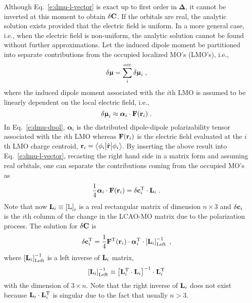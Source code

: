 \documentclass[aip,jcp,preprint,amsmath,amssymb,floatfix]{revtex4-1}
\newcommand{\tbraket}[3]{\ensuremath{\bigl\langle {#1} \bigl\lvert {#2} \bigl\lvert {#3} \bigr\rangle}}
\newcommand{\BM}[1]{\bm{#1}}
\begin{document}
Although Eq.~\eqref{e:dmu-l-vector}
is exact up to first order in ${\BM\Delta}$, it cannot be inverted at this moment to obtain $\delta {\bf C}$.
If the orbitals are real, the analytic solution exists
provided that the electric field is uniform. In a more general case, i.e., when the electric field
is non\hyp{}uniform, the analytic solution cannot be found without further approximations.
Let the induced dipole moment be partitioned into separate contributions
from the occupied localized MO's (LMO's), i.e.,
%
\begin{equation} \label{e:dmu-part}
 \delta {\BM{\upmu}} = \sum_i^{\rm occ} \delta {\BM{\upmu}}_i \;,
\end{equation}
%
where the induced dipole moment associated with the $i$th LMO
is assumed to be linearly dependent on the local electric field, i.e.,
%
\begin{equation} \label{e:dmu-dpol}
 \delta {\BM{\upmu}}_i \approx {\BM{\alpha}}_i \cdot {\bf F}({\bf r}_i) \;.
\end{equation}
%
In Eq.~\eqref{e:dmu-dpol}, ${\BM{\alpha}}_i$ is the distributed dipole\hyp{}dipole polarizability tensor
associated with the $i$th LMO whereas ${\bf F}({\bf r}_i)$ 
is the electric field evaluated at the $i$th LMO charge centroid,
${\bf r}_i = \tbraket{\phi_i}{\hat{\bf r}}{\phi_i}$.
By inserting the above result into Eq.~\eqref{e:dmu-l-vector},
recasting the right hand side in a matrix form
and assuming real orbitals,
one can separate the contributions coming from the occupied MO's as
%
\begin{equation} \label{e:dmu-l-vector-mo-transform-X}
 \frac{1}{4} {\BM{\alpha}}_i \cdot {\bf F}({\bf r}_i) 
   =
   \delta {\bf c}_i^{\rm T} \cdot {\bf L}_i \;.
\end{equation}
%
Note that now ${\bf L}_i \equiv \left[ \mathbb{L} \right]_i$ 
is a real rectangular matrix of dimension $n \times 3$ and $\delta{\bf c}_i$ is the $i$th column of the
change in the LCAO-MO matrix due to the polarization process.
The solution for $\delta {\bf C}$ is
%
\begin{equation} \label{e:mu-ind.matrix.linear.solution}
  \delta {\bf c}_i^{\rm T} = \frac{1}{4}
                    {\bf F}^{\rm T}({\bf r}_i) \cdot {\BM{\alpha}}_i^{\rm T} \cdot
                    \left[ {\bf L}_i  \right]^{-1}_{\rm Left} \;,
\end{equation}
%
where $\left[ {\bf L}_i  \right]^{-1}_{\rm Left}$ is a left inverse
of ${\bf L}_i$ matrix,
%
\begin{equation} 
      \left[ {\bf L}_i  \right]^{-1}_{\rm Left}   \equiv
       \left[ {\bf L}_i^{\rm T} \cdot {\bf L}_i \right]^{-1} \cdot {\bf L}_i^{\rm T}   
\end{equation}
%
with the dimension of $3\times n$. Note that the right inverse of ${\bf L}_i$
does not exist because ${\bf L}_i \cdot {\bf L}_i^{\rm T}$ is singular due to the fact that usually
$n > 3$.
\end{document}
